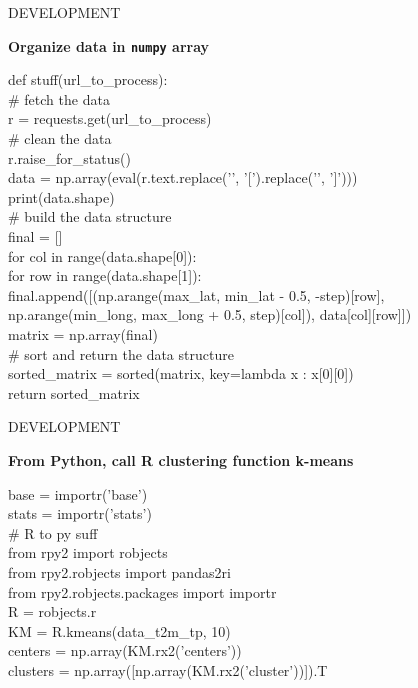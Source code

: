 \documentclass[xcolor=x11names,compress]{beamer}
\renewcommand{\(}{\begin{columns}}
\renewcommand{\)}{\end{columns}}
\newcommand{\<}[1]{\begin{column}{#1}}
\renewcommand{\>}{\end{column}}
\begin{document}
\begin{frame}{DEVELOPMENT}
\large
\begin{block}{}
\bf Organize data in \texttt{numpy} array
\end{block}
\begin{block}{}
  \bf 
 \scriptsize{
 \begin{texttt}{ def stuff(url\_to\_process):\\
\# fetch the data
\\
  r = requests.get(url\_to\_process)\\
  \# clean the data
\\
  r.raise\_for\_status()
\\
  data = np.array(eval(r.text.replace('{', '[').replace('}', ']')))
\\
  print(data.shape)\\
  \# build the data structure
\\
  final = []\\
  for col in range(data.shape[0]):
\\
    for row in range(data.shape[1]):\\
      final.append([(np.arange(max\_lat, min\_lat - 0.5, -step)[row], np.arange(min\_long, max\_long + 0.5, step)[col]), data[col][row]])
\\
  matrix = np.array(final)\\
  \# sort and return the data structure
\\
  sorted\_matrix = sorted(matrix, key=lambda x : x[0][0])
\\
  return sorted\_matrix}
\end{texttt}}
\end{block}
\end{frame}

\begin{frame}{DEVELOPMENT}
\large
\begin{block}{}
\bf From Python, call R clustering function \alert{k-means}
\end{block}
\begin{block}{}
  \bf 
 \scriptsize{
 \begin{texttt}{ 
base = importr('base')
\\
stats = importr('stats') \\
\# R to py suff
\\
from rpy2 import robjects \\
from rpy2.robjects import pandas2ri
\\
from rpy2.robjects.packages import importr \\
R = robjects.r
\\
\alert{KM = R.kmeans(data\_t2m\_tp, 10)} \\
centers = np.array(KM.rx2('centers'))
\\
clusters = np.array([np.array(KM.rx2('cluster'))]).T
\\
}
\end{texttt}}
\end{block}
\end{frame}
\end{document}
